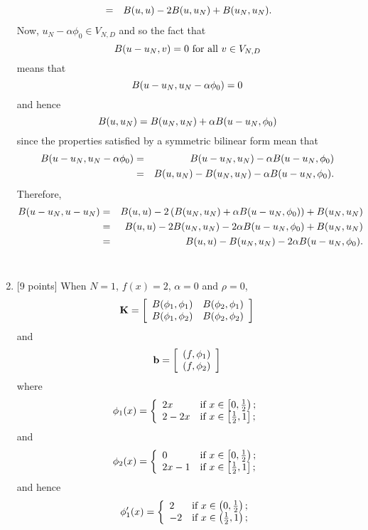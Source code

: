 \begin{solution}
\begin{enumerate}
\begin{eqnarray*}
\\
&=&B(u,u)-2B(u,u_N)+B(u_N,u_N).
\end{eqnarray*}
Now, $u_N-\alpha\phi_0\in V_{N,D}$ and so the fact that
\[
B(u-u_N,v)=0\mbox{ for all }v\in V_{N,D}
\]
means that
\[
B(u-u_N,u_N-\alpha\phi_0)=0
\]
and hence
\[
B(u,u_N)=B(u_N,u_N)+\alpha B(u-u_N,\phi_0)
\]
since the properties satisfied by a symmetric bilinear form mean that
\begin{eqnarray*}
B(u-u_N,u_N-\alpha\phi_0)&=&B(u-u_N,u_N)-\alpha B(u-u_N,\phi_0)
\\
&=&B(u,u_N)-B(u_N,u_N)-\alpha B(u-u_N,\phi_0).
\end{eqnarray*}
Therefore,
\begin{eqnarray*}
B(u-u_N,u-u_N)&=&B(u,u)-2\left(B(u_N,u_N)+\alpha B(u-u_N,\phi_0)\right)+B(u_N,u_N)
\\
&=&B(u,u)-2B(u_N,u_N)-2\alpha B(u-u_N,\phi_0)+B(u_N,u_N)
\\
&=&B(u,u)-B(u_N,u_N)-2\alpha B(u-u_N,\phi_0).
\end{eqnarray*}
\\
\item {[9 points]} When $N=1$, $f(x)=2$, $\alpha=0$ and $\rho=0$,
\[
{\bf K}=\left[\begin{array}{cc} B(\phi_1,\phi_1) & B(\phi_2,\phi_1) \\ B(\phi_1,\phi_2) & B(\phi_2,\phi_2)\end{array}\right]
\]
and
\[
{\bf b}=\left[\begin{array}{c}(f,\phi_1) \\ (f,\phi_2)\end{array}\right]
\]
where
\[
\phi_1(x) = \left\{\begin{array}{ll}
2x & \mbox{if }x\in\left[0,{1 \over 2}\right); \\ 2-2x & \mbox{if }x\in\left[{1 \over 2},1\right];\end{array}\right.
\]
and
\[
\phi_2(x) = \left\{\begin{array}{ll}
0 & \mbox{if }x\in\left[0,{1 \over 2}\right); \\ 2x-1 & \mbox{if }x\in\left[{1 \over 2},1\right];\end{array}\right.
\]
and hence
\[
\phi_1'(x) = \left\{\begin{array}{ll}
2 & \mbox{if }x\in\left(0,{1 \over 2}\right); \\ -2 & \mbox{if }x\in\left({1 \over 2},1\right);\end{array}\right.
\]
\end{enumerate}
\end{solution}
